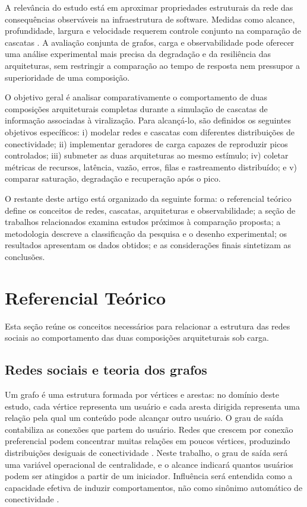 A relevância do estudo está em aproximar propriedades estruturais da rede das consequências observáveis na infraestrutura de software. Medidas como alcance, profundidade, largura e velocidade requerem controle conjunto na comparação de cascatas \cite{juul2021}. A avaliação conjunta de grafos, carga e observabilidade pode oferecer uma análise experimental mais precisa da degradação e da resiliência das arquiteturas, sem restringir a comparação ao tempo de resposta nem pressupor a superioridade de uma composição.

O objetivo geral é analisar comparativamente o comportamento de duas composições arquiteturais completas durante a simulação de cascatas de informação associadas à viralização. Para alcançá-lo, são definidos os seguintes objetivos específicos: i) modelar redes e cascatas com diferentes distribuições de conectividade; ii) implementar geradores de carga capazes de reproduzir picos controlados; iii) submeter as duas arquiteturas ao mesmo estímulo; iv) coletar métricas de recursos, latência, vazão, erros, filas e rastreamento distribuído; e v) comparar saturação, degradação e recuperação após o pico.

O restante deste artigo está organizado da seguinte forma: o referencial teórico define os conceitos de redes, cascatas, arquiteturas e observabilidade; a seção de trabalhos relacionados examina estudos próximos à comparação proposta; a metodologia descreve a classificação da pesquisa e o desenho experimental; os resultados apresentam os dados obtidos; e as considerações finais sintetizam as conclusões.

\estrutura\section{\esp Referencial Teórico}

Esta seção reúne os conceitos necessários para relacionar a estrutura das redes sociais ao comportamento das duas composições arquiteturais sob carga.

\estrutura\subsection{\esp Redes sociais e teoria dos grafos}

Um grafo é uma estrutura formada por vértices e arestas: no domínio deste estudo, cada vértice representa um usuário e cada aresta dirigida representa uma relação pela qual um conteúdo pode alcançar outro usuário. O grau de saída contabiliza as conexões que partem do usuário. Redes que crescem por conexão preferencial podem concentrar muitas relações em poucos vértices, produzindo distribuições desiguais de conectividade \cite{piva2021}. Neste trabalho, o grau de saída será uma variável operacional de centralidade, e o alcance indicará quantos usuários podem ser atingidos a partir de um iniciador. Influência será entendida como a capacidade efetiva de induzir comportamentos, não como sinônimo automático de conectividade \cite{zareie2023}.

